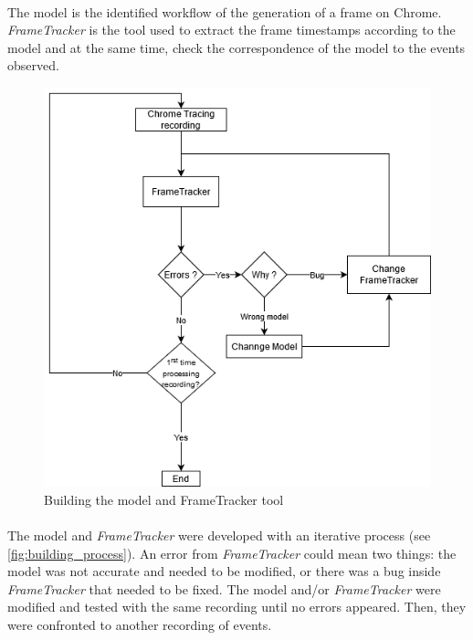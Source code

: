 \documentclass{kththesis}
\begin{document}
    \paragraph{}
    The model is the identified workflow of the generation of a frame on Chrome. \textit{FrameTracker} is the tool used to extract the frame timestamps according to the model and at the same time, check the correspondence of the model to the events observed. 
    
    \begin{figure}[h]
        \centering
        \includegraphics[width=13cm]{kththesis/Figures/building_model_diagram.png}
        \caption{Building the model and FrameTracker tool}
        \label{fig:building_process}
    \end{figure}
    
    \paragraph{}
    The model and \textit{FrameTracker} were developed with an iterative process (see \autoref{fig:building_process}). An error from \textit{FrameTracker} could mean two things: the model was not accurate and needed to be modified, or there was a bug inside \textit{FrameTracker} that needed to be fixed. The model and/or \textit{FrameTracker} were modified and tested with the same recording until no errors appeared. Then, they were confronted to another recording of events.  
    
\end{document}
